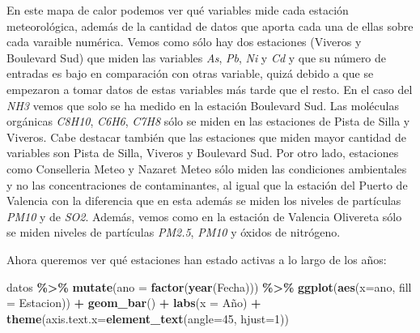 \documentclass[notspecified,article,submit,moreauthors,pdftex]{Definitions/mdpi}
\newenvironment{Shaded}{\begin{snugshade}}{\end{snugshade}}
\newcommand{\AttributeTok}[1]{\textcolor[rgb]{0.13,0.29,0.53}{#1}}
\newcommand{\DecValTok}[1]{\textcolor[rgb]{0.00,0.00,0.81}{#1}}
\newcommand{\FunctionTok}[1]{\textcolor[rgb]{0.13,0.29,0.53}{\textbf{#1}}}
\newcommand{\NormalTok}[1]{#1}
\newcommand{\SpecialCharTok}[1]{\textcolor[rgb]{0.81,0.36,0.00}{\textbf{#1}}}
\newcommand{\StringTok}[1]{\textcolor[rgb]{0.31,0.60,0.02}{#1}}
\begin{document}
En este mapa de calor podemos ver qué variables mide cada estación
meteorológica, además de la cantidad de datos que aporta cada una de
ellas sobre cada varaible numérica. Vemos como sólo hay dos estaciones
(Viveros y Boulevard Sud) que miden las variables \emph{As}, \emph{Pb},
\emph{Ni} y \emph{Cd} y que su número de entradas es bajo en comparación
con otras variable, quizá debido a que se empezaron a tomar datos de
estas variables más tarde que el resto. En el caso del \emph{NH3} vemos
que solo se ha medido en la estación Boulevard Sud. Las moléculas
orgánicas \emph{C8H10}, \emph{C6H6}, \emph{C7H8} sólo se miden en las
estaciones de Pista de Silla y Viveros. Cabe destacar también que las
estaciones que miden mayor cantidad de variables son Pista de Silla,
Viveros y Boulevard Sud. Por otro lado, estaciones como Conselleria
Meteo y Nazaret Meteo sólo miden las condiciones ambientales y no las
concentraciones de contaminantes, al igual que la estación del Puerto de
Valencia con la diferencia que en esta además se miden los niveles de
partículas \emph{PM10} y de \emph{SO2}. Además, vemos como en la
estación de Valencia Olivereta sólo se miden niveles de partículas
\emph{PM2.5}, \emph{PM10} y óxidos de nitrógeno.

Ahora queremos ver qué estaciones han estado activas a lo largo de los
años:

\begin{Shaded}
\begin{Highlighting}[]
\NormalTok{datos }\SpecialCharTok{\%\textgreater{}\%} 
  \FunctionTok{mutate}\NormalTok{(}\AttributeTok{ano =} \FunctionTok{factor}\NormalTok{(}\FunctionTok{year}\NormalTok{(Fecha))) }\SpecialCharTok{\%\textgreater{}\%} 
  \FunctionTok{ggplot}\NormalTok{(}\FunctionTok{aes}\NormalTok{(}\AttributeTok{x=}\NormalTok{ano, }\AttributeTok{fill =}\NormalTok{ Estacion)) }\SpecialCharTok{+} 
  \FunctionTok{geom\_bar}\NormalTok{() }\SpecialCharTok{+} 
  \FunctionTok{labs}\NormalTok{(}\AttributeTok{x =} \StringTok{\textquotesingle{}Año\textquotesingle{}}\NormalTok{) }\SpecialCharTok{+} 
  \FunctionTok{theme}\NormalTok{(}\AttributeTok{axis.text.x=}\FunctionTok{element\_text}\NormalTok{(}\AttributeTok{angle=}\DecValTok{45}\NormalTok{, }\AttributeTok{hjust=}\DecValTok{1}\NormalTok{))}
\end{Highlighting}
\end{Shaded}
\end{document}
